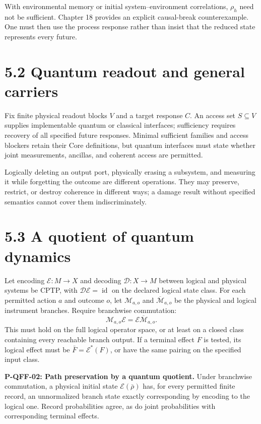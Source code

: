 \documentclass[
  11pt,
  oneside]{book}
\begin{document}
With environmental memory or initial system--environment correlations,
\(\rho_h\) need not be sufficient. Chapter 18 provides an explicit
causal-break counterexample. One must then use the process response
rather than insist that the reduced state represents every future.

\section{5.2 Quantum readout and general carriers}

Fix finite physical readout blocks \(V\) and a target response \(C\). An
access set \(S\subseteq V\) supplies implementable quantum or classical
interfaces; sufficiency requires recovery of all specified future
responses. Minimal sufficient families and access blockers retain their
Core definitions, but quantum interfaces must state whether joint
measurements, ancillas, and coherent access are permitted.

Logically deleting an output port, physically erasing a subsystem, and
measuring it while forgetting the outcome are different operations. They
may preserve, restrict, or destroy coherence in different ways; a damage
result without specified semantics cannot cover them indiscriminately.

\section{5.3 A quotient of quantum dynamics}

Let encoding \(\mathcal E:M\to X\) and decoding \(\mathcal D:X\to M\)
between logical and physical systems be CPTP, with
\(\mathcal D\mathcal E=\operatorname{id}\) on the declared logical state
class. For each permitted action \(a\) and outcome \(o\), let
\(\mathcal M_{a,o}\) and \(\overline{\mathcal M}_{a,o}\) be the physical
and logical instrument branches. Require branchwise commutation: \[
\mathcal M_{a,o}\mathcal E=\mathcal E\overline{\mathcal M}_{a,o}.
\] This must hold on the full logical operator space, or at least on a
closed class containing every reachable branch output. If a terminal
effect \(F\) is tested, its logical effect must be
\(\bar F=\mathcal E^*(F)\), or have the same pairing on the specified
input class.

\label{p-qff-02}{}

\textbf{P-QFF-02: Path preservation by a quantum quotient.} Under
branchwise commutation, a physical initial state
\(\mathcal E(\bar\rho)\) has, for every permitted finite record, an
unnormalized branch state exactly corresponding by encoding to the
logical one. Record probabilities agree, as do joint probabilities with
corresponding terminal effects.
\end{document}
